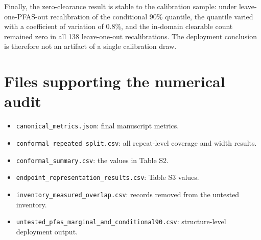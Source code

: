 \documentclass[11pt]{article}
\begin{document}
Finally, the zero-clearance result is stable to the calibration sample: under
leave-one-PFAS-out recalibration of the conditional 90\% quantile, the quantile varied with
a coefficient of variation of 0.8\%, and the in-domain clearable count remained zero in all
138 leave-one-out recalibrations. The deployment conclusion is therefore not an artifact of
a single calibration draw.

\section{Files supporting the numerical audit}

\begin{itemize}
\item \texttt{canonical\_metrics.json}: final manuscript metrics.
\item \texttt{conformal\_repeated\_split.csv}: all repeat-level coverage and width results.
\item \texttt{conformal\_summary.csv}: the values in Table S2.
\item \texttt{endpoint\_representation\_results.csv}: Table S3 values.
\item \texttt{inventory\_measured\_overlap.csv}: records removed from the untested inventory.
\item \texttt{untested\_pfas\_marginal\_and\_conditional90.csv}: structure-level deployment output.
\end{itemize}
\end{document}
